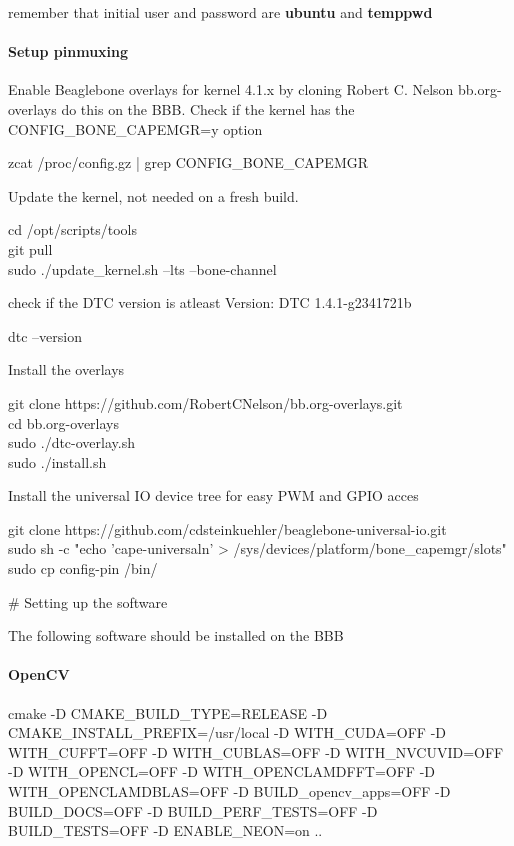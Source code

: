 remember that initial user and password are \textbf{ubuntu} and \textbf{temppwd} 

\paragraph{Setup pinmuxing}
Enable Beaglebone overlays for kernel 4.1.x by cloning Robert C. Nelson bb.org-overlays do this on the BBB. Check if the kernel has the CONFIG\_BONE\_CAPEMGR=y option  
\begin{sBox}
	zcat /proc/config.gz | grep CONFIG\_BONE\_CAPEMGR
\end{sBox}

Update the kernel, not needed on a fresh build.  
\begin{sBox}
	cd /opt/scripts/tools\\
	git pull\\
	sudo ./update\_kernel.sh --lts --bone-channel\\
\end{sBox}

check if the  DTC version is atleast Version: DTC 1.4.1-g2341721b  
\begin{sBox}
	dtc --version
\end{sBox}

Install the overlays
\begin{sBox}
	git clone https://github.com/RobertCNelson/bb.org-overlays.git\\
	cd bb.org-overlays\\
	sudo ./dtc-overlay.sh\\
	sudo ./install.sh\\
\end{sBox}

Install the universal IO device tree for easy PWM and GPIO acces  
\begin{sBox}
	git clone https://github.com/cdsteinkuehler/beaglebone-universal-io.git\\
	sudo sh -c "echo 'cape-universaln' > /sys/devices/platform/bone\_capemgr/slots"\\
	sudo cp config-pin /bin/\\
\end{sBox}


\# Setting up the software

The following software should be installed on the BBB

\paragraph{OpenCV}
\begin{sBox}
	cmake -D CMAKE\_BUILD\_TYPE=RELEASE -D CMAKE\_INSTALL\_PREFIX=/usr/local -D WITH\_CUDA=OFF -D WITH\_CUFFT=OFF -D WITH\_CUBLAS=OFF -D WITH\_NVCUVID=OFF -D WITH\_OPENCL=OFF -D WITH\_OPENCLAMDFFT=OFF -D WITH\_OPENCLAMDBLAS=OFF -D BUILD\_opencv\_apps=OFF -D BUILD\_DOCS=OFF -D BUILD\_PERF\_TESTS=OFF -D BUILD\_TESTS=OFF -D ENABLE\_NEON=on ..
\end{sBox}
